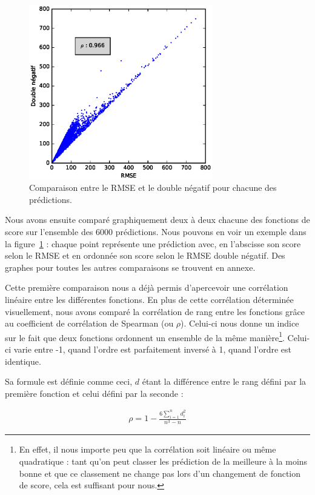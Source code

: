 \documentclass[letterpaper]{article}
\begin{document}
\begin{figure}
   \centerline{\includegraphics[width=8cm]{metrics.eps}}
   \caption{\label{fig:rmse-vs-double}Comparaison entre le RMSE et le double négatif pour chacune des prédictions.}
\end{figure}

Nous avons ensuite comparé graphiquement deux à deux chacune des fonctions de score sur l'ensemble des 6000 prédictions. Nous pouvons en voir un exemple dans la figure~\ref{fig:rmse-vs-double} : chaque point représente une prédiction avec, en l’abscisse son score selon le RMSE et en ordonnée son score selon le RMSE double négatif. Des graphes pour toutes les autres comparaisons se trouvent en annexe.

Cette première comparaison nous a déjà permis d'apercevoir une corrélation linéaire entre les différentes fonctions.
En plus de cette corrélation déterminée visuellement, nous avons comparé la corrélation de rang entre les fonctions grâce au coefficient de corrélation de Spearman (ou $\rho$). Celui-ci nous donne un indice sur le fait que deux fonctions ordonnent un ensemble de la même manière\footnote{En effet, il nous importe peu que la corrélation soit linéaire ou même quadratique : tant qu'on peut classer les prédiction de la meilleure à la moins bonne et que ce classement ne change pas lors d'un changement de fonction de score, cela est suffisant pour nous.}. Celui-ci varie entre -1, quand l'ordre est parfaitement inversé à 1, quand l'ordre est identique.

Sa formule est définie comme ceci, $d$ étant la différence entre le rang défini par la première fonction et celui défini par la seconde :

\begin{eqnarray}
\rho = 1 - \frac{6 \sum_{i=1}^{n} d^2_i}{n^3 - n}
\end{eqnarray}
\end{document}
